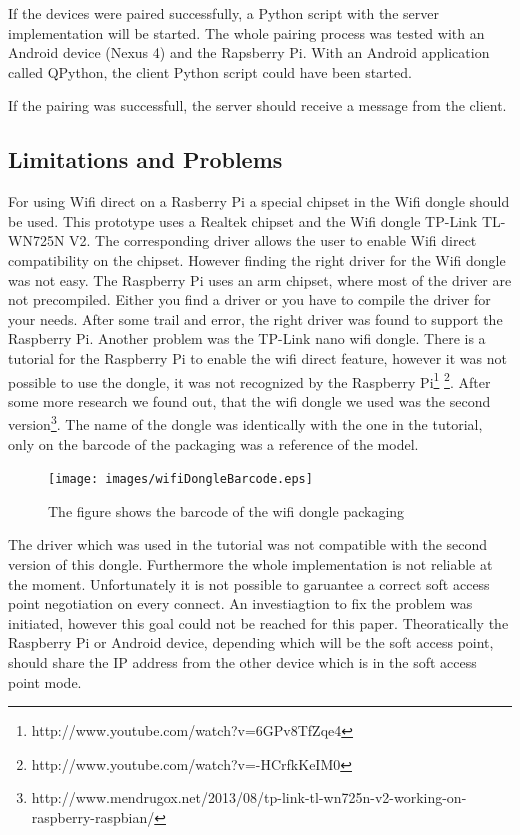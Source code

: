 \noindent If the devices were paired successfully, a Python script with the server implementation will be started.
The whole pairing process was tested with an Android device (Nexus 4) and the Rapsberry Pi. With an Android application called QPython, the client Python script could have been started.

If the pairing was successfull, the server should receive a message from the client.

\subsection*{Limitations and Problems}
\label{subsec:RaspberryLimitationsProblems}
For using Wifi direct on a Rasberry Pi a special chipset in the Wifi dongle should be used. This prototype uses a Realtek chipset and the Wifi dongle TP-Link TL-WN725N V2. The corresponding driver allows the user to enable Wifi direct compatibility on the chipset. However finding the right driver for the Wifi dongle was not easy. The Raspberry Pi uses an arm chipset, where most of the driver are not precompiled. Either you find a driver or you have to compile the driver for your needs. After some trail and error, the right driver was found to support the Raspberry Pi. Another problem was the TP-Link nano wifi dongle. There is  a tutorial for the Raspberry Pi to enable the wifi direct feature, however it was not possible to use the dongle, it was not recognized by the Raspberry Pi\footnote{http://www.youtube.com/watch?v=6GPv8TfZqe4} \footnote{http://www.youtube.com/watch?v=-HCrfkKeIM0}. After some more research we found out, that the wifi dongle we used was the second version\footnote{http://www.mendrugox.net/2013/08/tp-link-tl-wn725n-v2-working-on-raspberry-raspbian/}. The name of the dongle was identically with the one in the tutorial, only on the barcode of the packaging was a reference of the model.

\begin{figure}[!hb]
	\centering
  \texttt{[image: images/wifiDongleBarcode.eps]}
	\caption{The figure shows the barcode of the wifi dongle packaging}
	\label{fig1}
\end{figure}

\noindent The driver which was used in the tutorial was not compatible with the second version of this dongle. Furthermore the whole implementation is not reliable at the moment. Unfortunately it is not possible to garuantee a correct soft access point negotiation on every connect. An investiagtion to fix the problem was initiated, however this goal could not be reached for this paper. Theoratically the Raspberry Pi or Android device, depending which will be the soft access point, should share the IP address from the other device which is in the soft access point mode.


